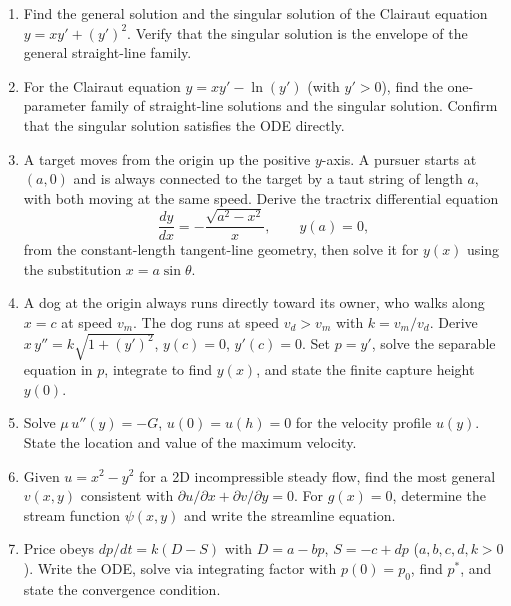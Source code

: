 \begin{enumerate}[leftmargin=2em, itemsep=8pt]

    \item Find the general solution and the singular solution of the Clairaut
          equation $y = xy' + (y')^2$. Verify that the singular solution is
          the envelope of the general straight-line family.

    \item For the Clairaut equation $y = xy' - \ln(y')$ (with $y' > 0$),
          find the one-parameter family of straight-line solutions and the
          singular solution. Confirm that the singular solution satisfies the
          ODE directly.

    \item A target moves from the origin up the positive $y$-axis. A pursuer
          starts at $(a,0)$ and is always connected to the target by a taut
          string of length $a$, with both moving at the same speed. Derive the
          tractrix differential equation
          \[
            \frac{dy}{dx} = -\frac{\sqrt{a^2 - x^2}}{x},
            \qquad y(a) = 0,
          \]
          from the constant-length tangent-line geometry, then solve it for
          $y(x)$ using the substitution $x = a\sin\theta$.

    \item A dog at the origin always runs directly toward its owner, who walks
          along $x = c$ at speed $v_m$. The dog runs at speed $v_d > v_m$ with
          $k = v_m/v_d$. Derive $x\,y'' = k\sqrt{1+(y')^2}$, $y(c) = 0$,
          $y'(c) = 0$. Set $p = y'$, solve the separable equation in $p$,
          integrate to find $y(x)$, and state the finite capture height $y(0)$.

    \item Solve $\mu\,u''(y) = -G$, $u(0) = u(h) = 0$ for the velocity profile
          $u(y)$. State the location and value of the maximum velocity.

    \item Given $u = x^2 - y^2$ for a 2D incompressible steady flow, find the
          most general $v(x,y)$ consistent with $\partial u/\partial x +
          \partial v/\partial y = 0$. For $g(x) = 0$, determine the stream
          function $\psi(x,y)$ and write the streamline equation.

    \item Price obeys $dp/dt = k(D - S)$ with $D = a - bp$, $S = -c + dp$
          ($a,b,c,d,k > 0$). Write the ODE, solve via integrating factor with
          $p(0) = p_0$, find $p^*$, and state the convergence condition.


\end{enumerate}
